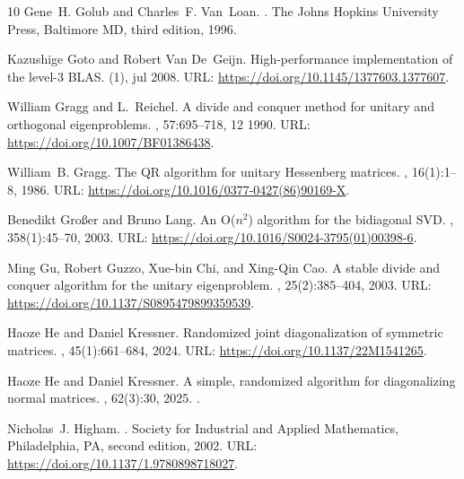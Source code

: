 \documentclass[10pt,twoside,dvipsnames]{siamart1116}
\numberwithin{algorithm}{section}
\numberwithin{equation}{section}
\begin{document}
\begin{thebibliography}{10}
Gene~H. Golub and Charles~F. Van~Loan.
.
\newblock The Johns Hopkins University Press, Baltimore MD, third edition,
  1996.

Kazushige Goto and Robert Van De~Geijn.
\newblock High-performance implementation of the level-3 {BLAS}.
(1), jul 2008.
\newblock URL: \url{https://doi.org/10.1145/1377603.1377607}.

William Gragg and L.~Reichel.
\newblock A divide and conquer method for unitary and orthogonal eigenproblems.
, 57:695--718, 12 1990.
\newblock URL: \url{https://doi.org/10.1007/BF01386438}.

William~B. Gragg.
\newblock The {QR} algorithm for unitary {H}essenberg matrices.
, 16(1):1--8,
  1986.
\newblock URL: \url{https://doi.org/10.1016/0377-0427(86)90169-X}.

Benedikt Großer and Bruno Lang.
\newblock An {O}($n^2$) algorithm for the bidiagonal {SVD}.
, 358(1):45--70, 2003.
\newblock URL: \url{https://doi.org/10.1016/S0024-3795(01)00398-6}.

Ming Gu, Robert Guzzo, Xue-bin Chi, and Xing-Qin Cao.
\newblock A stable divide and conquer algorithm for the unitary eigenproblem.
,
  25(2):385--404, 2003.
\newblock URL: \url{https://doi.org/10.1137/S0895479899359539}.

Haoze He and Daniel Kressner.
\newblock Randomized joint diagonalization of symmetric matrices.
,
  45(1):661--684, 2024.
\newblock URL: \url{https://doi.org/10.1137/22M1541265}.

Haoze He and Daniel Kressner.
\newblock A simple, randomized algorithm for diagonalizing normal matrices.
, 62(3):30, 2025.
\newblock \href {https://doi.org/10.1007/s10092-025-00654-z}
  {}.

Nicholas~J. Higham.
.
\newblock Society for Industrial and Applied Mathematics, Philadelphia, PA,
  second edition, 2002.
\newblock URL: \url{https://doi.org/10.1137/1.9780898718027}.


\end{thebibliography}
\end{document}
